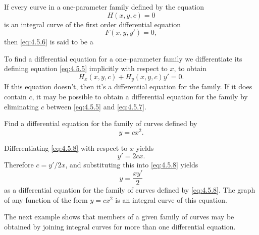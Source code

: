 \documentclass{ximera}
\begin{document}
\begin{definition}\label{thmtype:4.5.2}
If every curve in a one-parameter family defined by the equation
\begin{equation} \label{eq:4.5.5}
H(x,y,c)=0
\end{equation}
is an integral curve of the first order differential equation
\begin{equation} \label{eq:4.5.6}
F(x,y,y')=0,
\end{equation}
then  \eqref{eq:4.5.6} is said to be a 
\end{definition}
 
To find a differential equation for a one--parameter family we
differentiate its defining equation \eqref{eq:4.5.5} implicitly with
respect to $x$, to obtain
\begin{equation} \label{eq:4.5.7}
H_x(x,y,c)+H_y(x,y,c)y'=0.
\end{equation}
If this equation doesn't, then it's a differential
equation for the family. If it does contain $c$, it may be
possible to obtain a differential equation for the family by
eliminating $c$ between \eqref{eq:4.5.5} and \eqref{eq:4.5.7}.
 
\begin{example}\label{example:4.5.5}
Find a differential equation for the family of curves defined by
\begin{equation}  \label{eq:4.5.8}
y=cx^2.
\end{equation}
 
 
\begin{explanation} Differentiating
\eqref{eq:4.5.8} with respect to $x$ yields
$$
y'=2cx.
$$
 Therefore $c=y'/2x$, and substituting this into
\eqref{eq:4.5.8} yields
$$
y=\frac{xy'}{2}
$$
 as a differential equation for the family of
curves defined by \eqref{eq:4.5.8}.  The graph of any function of
the form $y=cx^2$ is an integral curve of this equation. \end{explanation}
\end{example}
 
The next example shows that members of a given family of curves
may be obtained by joining  integral curves for more than one
differential equation.
 
\end{document}

